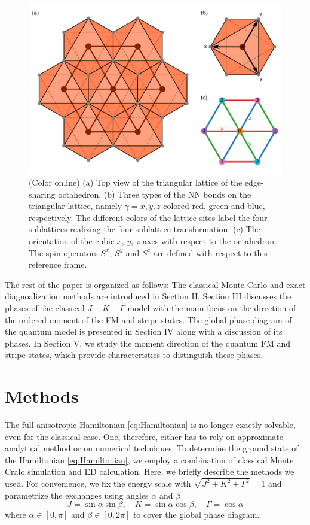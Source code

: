 \documentclass[aps,prb,reprint,amsfonts,amsmath,amssymb,showpacs,groupedaddress,superscriptaddress]{revtex4-1}
\begin{document}
\begin{figure}
    \includegraphics[width=\columnwidth]{Fig1.pdf}
    \caption{(Color online) (a) Top view of the triangular lattice of the edge-sharing octahedron. (b) Three types of the NN bonds on the triangular lattice, namely $\gamma=x, y, z$ colored red, green and blue, respectively. The different colors of the lattice sites label the four sublattices realizing the four-sublattice-transformation. (c) The orientation of the cubic $x$, $y$, $z$ axes with respect to the octahedron. The spin operators $S^x$, $S^y$ and $S^z$ are defined with respect to this reference frame.}
    \label{fig:ModelDefinition}
\end{figure}

The rest of the paper is organized as follows: The classical Monte Carlo and exact diagnoalization methods are introduced in Section II. Section III discusses the phases of the classical $J-K-\Gamma$ model with the main focus on the direction of the ordered moment of the FM and stripe states. The global phase diagram of the quantum model is presented in Section IV along with a discussion of its phases. In Section V, we study the moment direction of the quantum FM and stripe states, which provide characteristics to distinguish these phases.

\section{Methods}
The full anisotropic Hamiltonian \eqref{eq:Hamiltonian} is no longer exactly solvable, even for the classical case. One, therefore, either has to rely on approximate analytical method or on numerical techniques. To determine the ground state of the Hamiltonian \eqref{eq:Hamiltonian}, we employ a combination of classical Monte Cralo simulation and ED calculation. Here, we briefly describe the methods we used. For convenience, we fix the energy scale with $\sqrt{J^2 + K^2 + \Gamma^2}=1$ and parametrize the exchanges using angles $\alpha$ and $\beta$
\begin{equation}
    J=\sin\alpha \sin\beta, \quad K=\sin\alpha \cos\beta, \quad \Gamma=\cos\alpha
    \label{eq:Parameters}
\end{equation}
where $\alpha \in [0, \pi]$ and $\beta \in [0, 2\pi]$ to cover the global phase diagram.
\end{document}
